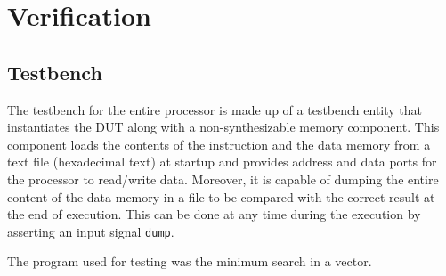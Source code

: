 \chapter{Verification}



\newpage

\section{Testbench}
The testbench for the entire processor is made up of a testbench entity that instantiates the DUT along with a non-synthesizable memory component. This component loads the contents of the instruction and the data memory from a text file (hexadecimal text) at startup and provides address and data ports for the processor to read/write data. Moreover, it is capable of dumping the entire content of the data memory in a file to be compared with the correct result at the end of execution. This can be done at any time during the execution by asserting an input signal \texttt{dump}.

The program used for testing was the minimum search in a vector.  
